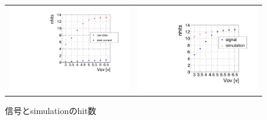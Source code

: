 \documentclass[uplatex, titlepage, dvipdfmx, 12pt, a4paper]{jsreport}
\begin{document}
    \begin{figure}[h]
      \begin{tabular}{cc}
        \begin{minipage}[t]{0.45\hsize}
          \centering
          \includegraphics[scale=0.4, clip]{image/hit_count.pdf}
          \caption{信号と暗電流のhit数} 
          \label{fig:hit_dark} 
        \end{minipage} &
        \begin{minipage}[t]{0.45\hsize}
          \centering
          \includegraphics[scale=0.35, clip]{image/hit_simulation.pdf}
          \caption{信号とsimulationのhit数} 
          \label{fig:hit_simulation} 
        \end{minipage}
      \end{tabular}
    \end{figure}
    
\end{document}
